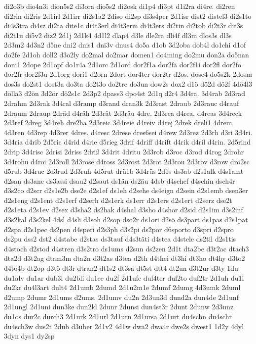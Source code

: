 {di2o3b
dio4n3i
dion5s2
di3ora
dio5s2
di2osk
di1p4
di3pt
d1i2ra
di4re.
di2ren
di2rin
di2ris
2d1irl
2d1irr
di2s1a2
2diso
di2sp
di3s4per
2d1isr
dist2
distel3
di2s1to
di4s3tra
di4sz
di2ta
dite1c
di4t3erl
di4t3erm
di4t3ers
di2tin
di2tob
di2t3r
dit3s
di2t1u
di5v2
diz2
2d1j
2d1k4
4d1l2
dlap4
d3le
dle2ra
dli4f
dl3m
dlos3s
dl3s
2d3m2
4d3n2
d5ne
dni2
dnis1
dni3v
dnus4
do5a
d1ob
3d2oba
dob4l
do1chi
d1of
do2fe
2d1oh
doll2
d3o2ly
do2mal
do2mar
domen1
do4ming
do2mu
don2a
do5nan
doni1
2dope
2d1opf
do1r4a
2d1orc
2d1ord
dor2f1a
dor2fä
dor2f1i
dor2fl
dor2fo
dor2fr
dor2f3u
2d1org
dori1
d2orn
2dort
dor4ter
dor2tr
d2os.
dose4
do5s2k
2dosm
dos3s
do2st1
dost3a
do3ta
do2t3o
do2tre
do3un
dow2s
dox2
d1ö
dö2d
dö2f
4dö4l3
dölla3
d2ön
3d2ör
dö2s1c
2d3p2
dpass3
dpo4st
2d1q
d2r4
3d4ra.
3d4rab
2d3rad
2drahm
2d3rak
3d4ral
d3ramp
d3rand
dran3k
2d3rast
2draub
2d3rauc
d4rauf
2draum
2draup
2dräd
d4räh
2d3rät
2d3räu
4dre.
2d3rea
d4rea.
d4reas
3d4reck
2d3ref
2dreg
3d4reh
dre2ha
2d3reic
3d4reie
d4reiv
d4rej
2drek
dreli1
4drem
4d3ren
4d3rep
4d3rer
4dres.
d4resc
2drese
dres6sei
d4rew
2d3rez
2d3rh
d3ri
3d4ri.
3d4ria
d4rib
2d5ric
d4rid
d4rie
d5rieg
3drif
4driff
d4rift
d4rik
d4ril
d4rin.
2d5rind
2drip
3d4risc
2drisi
2driss
2driß
3d4rit
4dritu
2d3rob
d3roc
d3rod
d4rog
2drohr
3d4rohu
d4roi
2d3roll
2d3rose
d4ross
2d3rost
2d3rot
2d3rou
2d3rov
d3row
drö2sc
d5rub
3d4ruc
2d3rud
2d3ruh
4d5rut
drü1b
3d4rüs
2d1s
ds3ab
d2s1alk
d4s1amt
d2san
ds3ane
ds3assi
dsau2
d2saut
ds1än
ds2äu
4dsb
d4schef
d4schin
dsch4r
d3s2co
d2scr
d2s1e2b
dse2e
d2s1ef
ds1eh
d2sehe
ds4eign
d2sein
d2s1emb
dsen3er
d2s1eng
d2s1ent
d2s1erf
d2serh
d2s1erk
ds1err
d2s1ers
d2s1ert
d2serz
dse2t
d2s1eta
d2s1ev
d2sex
d3sha2
ds2hak
d4shal
d3sho
d4shor
d2sid
d2s1im
d3s2inf
d3s2kal
d3s2kel
4dsl
d4sli
d3soh
d2sop
dso2r
ds1ori
d2sö
ds3part
ds1pas
d2s1pat
d2spä
d2s1pec
ds2pen
d4speri
d2s3ph
d3s2pi
ds2por
d6sporto
d3spri
d2spro
ds2pu
dss2
dst2
d4stabe
d2stas
ds3tauf
d4s3täti
d4stea
d4stele
ds2til
d2s1tis
d4stoch
d2stod
d4stren
d3s2tro
ds1ums
d2sun
ds2zen
2d1t
dta2be
d3t2ac
dtach3
dta2d
d3t2ag
dtam3m
dta2n
d3t2as
d3tea
d2th
d4thei
dt3hi
dt3ho
dt4hy
d3to2
d4to4b
dt2op
d3tö
dt3r
dtran2
dt1s2
dt3sa
dt5st
dtt4
dt2un
d3t2ur
d3ty
1du
du1alv
du1ar
dub3l
du2bli
du1ce
du2f
2d1ufe
duf4ter
duf2to
duf2tr
2d1uh
du1i
du2kr
du4l3art
dult4
2d1umb
2dumd
2d1u2m1e
2dumf
2dumg
4d3umk
2duml
d2ump
2dumr
2d1ums
d2ums.
2d1umv
du2n
2d3un3d
dund2a
dun4de
2d1unf
2d1ungl
2d1uni
dun3ke
dun2kl
2dunr
2dunsi
dun4st3r
2dunt
2dunw
2d3unz
du1os
dur2c
durch3
2d1urk
2d1url
2d1urn
2d1ursa
2d1urt
du4schn
du4schr
du4sch3w
dus2t
2düb
d3über
2d1v2
4d1w
dwa2
dwa4r
dwe2s
dwest1
1d2y
4dyl
3dyn
dys1
dy2sp
}
